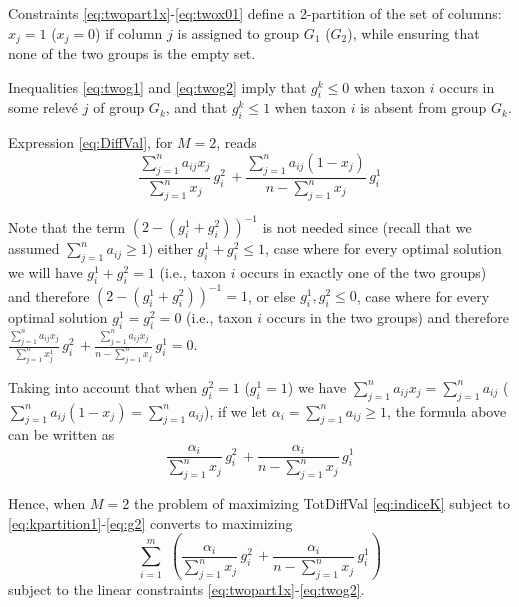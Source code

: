 Constraints \eqref{eq:twopart1x}-\eqref{eq:twox01} define a 2-partition of the set of columns: \(x_j=1\) (\(x_j=0\)) if column \(j\) is assigned to group \(G_1\) (\(G_2\)), while ensuring that none of the two groups is the empty set.

Inequalities \eqref{eq:twog1} and \eqref{eq:twog2} imply that \(g_i^k\leq 0\) when taxon \(i\) occurs in some relevé \(j\) of group \(G_k\), and that \(g_i^k\leq 1\) when taxon \(i\) is absent from group \(G_k\).

Expression \eqref{eq:DiffVal}, for \(M=2\), reads
\begin{equation*}
\displaystyle{
\frac{\sum_{j=1}^n a_{ij} x_j}{\sum_{j=1}^n x_j} \, g_i^2 
\,+
\frac{\sum_{j=1}^n a_{ij} (1-x_j)}{n-\sum_{j=1}^n x_j} \, g_i^1 
}
\end{equation*}

Note that the term \((2-(g_i^1+g_i^2))^{-1}\) is not needed since (recall that we assumed \(\sum_{j=1}^n a_{ij} \geq 1\)) either \(g_i^1+g_i^2\leq 1\), case where for every optimal solution we will have \(g_i^1+g_i^2=1\) (i.e., taxon \(i\) occurs in exactly one of the two groups) and therefore \((2-(g_i^1+g_i^2))^{-1}=1\), or else \(g_i^1, g_i^2\leq 0\), case where for every optimal solution \(g_i^1=g_i^2= 0\) (i.e., taxon \(i\) occurs in the two groups) and therefore \(\frac{\sum_{j=1}^n a_{ij} x_j}{\sum_{j=1}^n x_j^1} \, g_i^2 \,+ \frac{\sum_{j=1}^n a_{ij} x_j}{n-\sum_{j=1}^n x_j} \, g_i^1 =0\).

Taking into account that when \(g_i^2=1\) (\(g_i^1=1\)) we have \(\sum_{j=1}^n a_{ij} x_j= \sum_{j=1}^n a_{ij}\) (\(\sum_{j=1}^n a_{ij} (1-x_j)= \sum_{j=1}^n a_{ij}\)), if we let \(\alpha_i=\sum_{j=1}^n a_{ij} \geq 1\), the formula above can be written as
\begin{equation*}
\displaystyle{
\frac{\alpha_{i}}{\sum_{j=1}^n x_j} \, g_i^2 
\,+
\frac{\alpha_{i}}{n-\sum_{j=1}^n x_j} \, g_i^1 
}
\label{eq:DiffVal2}
\end{equation*}

Hence, when \(M=2\) the problem of maximizing TotDiffVal \eqref{eq:indiceK} subject to \eqref{eq:kpartition1}-\eqref{eq:g2} converts to maximizing
\begin{equation}
\displaystyle{
\displaystyle{\sum_{i=1}^m}\,\,
\left(\frac{\alpha_{i}}{\sum_{j=1}^n x_j} \, g_i^2
\,+
\frac{\alpha_{i}}{n-\sum_{j=1}^n x_j} \, g_i^1 \right)
}
\label{eq:TotDiffVal2}
\end{equation}
subject to the linear constraints \eqref{eq:twopart1x}-\eqref{eq:twog2}.

